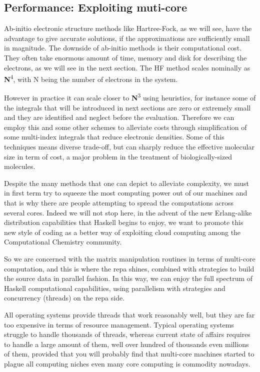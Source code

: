 \documentclass{tmr}
\begin{document}
\subsection{Performance: Exploiting muti-core}

Ab-initio electronic structure methods like Hartree-Fock, as we will see,
 have the advantage to give accurate solutions, if the approximations 
are sufficiently small in magnitude. The downside of ab-initio methods
 is their computational cost. They often take enormous amount of time, 
memory and disk for describing the electrons, as we will see in the next section. The HF method scales nominally 
as {\textbf N\textsuperscript{4}}, with N being the number of electrons in the system. 


However in practice it can scale closer to {\textbf N\textsuperscript{3}} using heuristics,
for instance some of the integrals that will be introduced in next sections are zero or extremely
small and they are identified and neglect before the evaluation. Therefore we can employ this and some other
schemes to alleviate costs through simplification of some multi-index integrals that reduce electronic densities. 
Some of this techniques means diverse trade-off, but can sharply reduce the effective molecular size
in term of cost, a major problem in the treatment of biologically-sized molecules.

Despite the many methods that one can depict to alleviate complexity,
 we must in first term try to squeeze the most computing power out of our machines
and that is why there are people attempting to spread the computations across several cores.
 Indeed we will not stop here, in the advent of the new Erlang-alike 
distribution capabilities that Haskell begins to enjoy, we want to promote this new style of
 coding as a better way of exploiting cloud computing among the 
Computational Chemistry community.

So we are concerned with the matrix manipulation routines in terms of multi-core computation,
and this is where the repa shines, combined with strategies to build the source data in parallel fashion. In this way,
we can enjoy the full spectrum of Haskell computational capabilities, using parallelism with strategies and
concurrency (threads) on the repa side.

All operating systems provide threads that work reasonably well, but they are far too expensive in terms 
of resource management. Typical operating systems struggle to handle thousands of threads, whereas current state of 
affairs requires to handle a large amount of them, well over hundred of thousands even millions of them, 
provided that you will probably find that multi-core machines started to plague all computing
niches even many core computing is commodity nowadays.
\end{document}
